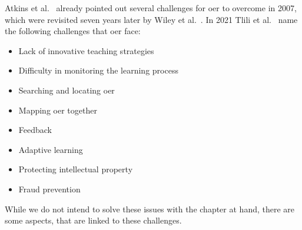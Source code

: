 Atkins et al.~\cite{atkins:2007:review} already pointed out several challenges for \acrshort{oer} to overcome in 2007, which were revisited seven years later by Wiley et al.~\cite{wiley:2014:oer}. In 2021  Tlili et al.~\cite{tlili:2021:towards} name the following challenges that \acrshort{oer} face:
\begin{itemize}
	\setlength{\itemsep}{-0.3cm}
	\item Lack of innovative teaching strategies
	\item Difficulty in monitoring the learning process
	\item Searching and locating \acrshort{oer}
	\item Mapping \acrshort{oer} together
	\item Feedback
	\item Adaptive learning
	\item Protecting intellectual property
	\item Fraud prevention
\end{itemize}

While we do not intend to solve these issues with the chapter at hand, there are some aspects, that are linked to these challenges.

